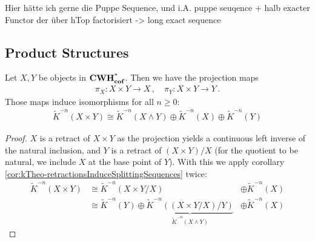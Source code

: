 Hier hätte ich gerne die Puppe Sequence, und i.A. puppe seuqence + halb exacter Functor der über hTop factorisiert -> long exact sequence 
\subsection{Product Structures}
\begin{corollary}
	Let $X,Y$ be objects in $\operatorname{\mathbf{CWH^*_{cof}}}$. Then we have the projection maps 
	\begin{align*}
		\pi_X:X\times Y\to X \, , \quad \pi_Y:X\times Y\to Y\, .
	\end{align*} Those maps induce isomorphisms for all $n\geq0:$
	\begin{align*}
		\tilde{K}^{-n}(X\times Y)\cong \tilde{K}^{-n}(X\wedge Y)\oplus \tilde{K}^{-n}(X)\oplus \tilde{K}^{-n}(Y)
	\end{align*}
\end{corollary}
\begin{proof}
	$X$ is a retract of $X\times Y$ as the projection yields a continuous left inverse of the natural inclusion, and $Y$ is a retract of $(X\times Y)\slash X$ (for the quotient to be natural, we include $X$ at the base point of $Y$). With this we apply corollary \ref{cor:kTheo-retractionsInduceSplittingSequences} twice:
	\begin{equation*}
		\begin{array}{lll}
			\tilde{K}^{-n}(X\times Y)&\cong \tilde{K}^{-n}(X\times Y \slash X) & \oplus \tilde{K}^{-n}(X) \\
			&\cong \tilde{K}^{-n}(Y) \oplus \underbrace{\tilde{K}^{-n}((X\times Y \slash X )\slash Y)}_{\tilde{K}^{-n}(X\wedge Y)}&\oplus\tilde{K}^{-n}(X)  
			    \end{array}
	\end{equation*}
\end{proof}

